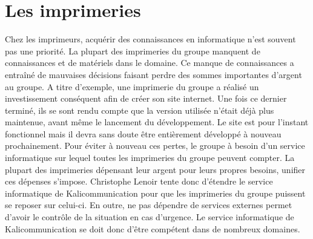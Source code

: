 
\section{Les imprimeries}
Chez les imprimeurs, acquérir des connaissances en informatique n'est souvent pas une priorité. La plupart des imprimeries du groupe manquent de connaissances et de matériels dans le domaine. Ce manque de connaissances a entraîné de mauvaises décisions faisant perdre des sommes importantes d'argent au groupe.\newline
A titre d'exemple, une imprimerie du groupe a réalisé un investissement conséquent afin de créer son site internet. Une fois ce dernier terminé, ils se sont rendu compte que la version utilisée n'était déjà plus maintenue, avant même le lancement du développement. Le site est pour l'instant fonctionnel mais il devra sans doute être entièrement développé à nouveau prochainement.\newline
Pour éviter à nouveau ces pertes, le groupe à besoin d'un service informatique sur lequel toutes les imprimeries du groupe peuvent compter. La plupart des imprimeries dépensant leur argent pour leurs propres besoins, unifier ces dépenses s'impose. Christophe Lenoir tente donc d'étendre le service informatique de Kalicommunication pour que les imprimeries du groupe puissent se reposer sur celui-ci. En outre, ne pas dépendre de services externes permet d'avoir le contrôle de la situation en cas d'urgence. Le service informatique de Kalicommunication se doit donc d'être compétent dans de nombreux domaines.

